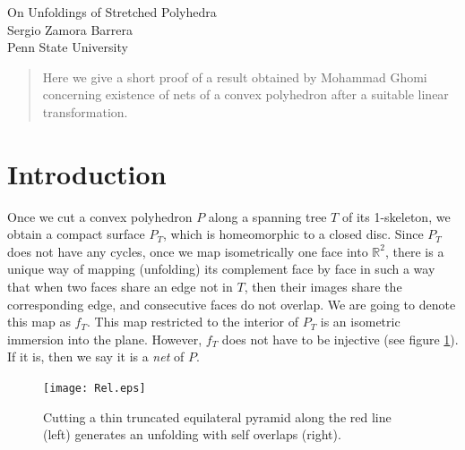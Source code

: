 \documentclass[openright, 12pt]{article}
\newcommand{\field}[1]{\ensuremath{\mathbb{#1}}}
\newcommand{\R}{\field{R}}
\begin{document}
\begin{center}
\Large{On Unfoldings of Stretched Polyhedra}\\
\normalsize{ Sergio Zamora Barrera}\\
Penn State University
\end{center}



\begin{abstract}
\noindent Here we give a short proof of a result obtained by Mohammad Ghomi concerning existence of nets of a convex polyhedron after a suitable linear transformation.

\end{abstract}


\section*{Introduction}


Once we cut a convex polyhedron $P$ along a spanning tree $T$ of its 1-skeleton, we obtain a compact surface $P_T$, which is homeomorphic to a closed disc. Since $P_T$ does not have any cycles, once we map isometrically one face into $\R^2$, there is a unique way of mapping (unfolding) its complement face by face in such a way that when two faces share an edge not in $T$, then their images share the corresponding edge, and consecutive faces do not overlap. We are going to denote this map as $f_T$. This map restricted to the interior of $P_T$ is an isometric immersion into the plane. However, $f_T$ does not have to be injective (see figure \ref{Tet}). If it is, then we say it is a \textit{net} of $P$.




\begin{figure}[h]
\centering
\texttt{[image: Rel.eps]}
\caption{Cutting a thin truncated equilateral pyramid along the red line (left) generates an unfolding with self overlaps (right).}\label{Tet}
\end{figure}
\end{document}
